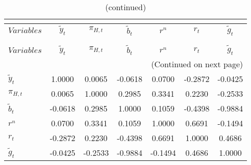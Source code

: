  
\begin{center}
\begin{longtable}{lcccccc} 
\caption{MATRIX OF CORRELATIONS}\\
 \label{Table:th_corr_matrix}\\
\toprule 
$Variables        $	 & 	 $   {\tilde{y}_{t}}$	 & 	 $       {\pi_{H,t}}$	 & 	 $     \tilde{b}_{t}$	 & 	 $            {r^{n}}$	 & 	 $            {r_{t}}$	 & 	 $     \tilde{g}_{t}$\\
\midrule \endfirsthead 
\caption{(continued)}\\
 \toprule \\ 
$Variables        $	 & 	 $   {\tilde{y}_{t}}$	 & 	 $       {\pi_{H,t}}$	 & 	 $     \tilde{b}_{t}$	 & 	 $            {r^{n}}$	 & 	 $            {r_{t}}$	 & 	 $     \tilde{g}_{t}$\\
\midrule \endhead 
\midrule \multicolumn{7}{r}{(Continued on next page)} \\ \bottomrule \endfoot 
\bottomrule \endlastfoot 
${\tilde{y}_{t}}  $	 & 	             1.0000	 & 	             0.0065	 & 	            -0.0618	 & 	             0.0700	 & 	            -0.2872	 & 	            -0.0425 \\ 
${\pi_{H,t}}      $	 & 	             0.0065	 & 	             1.0000	 & 	             0.2985	 & 	             0.3341	 & 	             0.2230	 & 	            -0.2533 \\ 
$\tilde{b}_{t}    $	 & 	            -0.0618	 & 	             0.2985	 & 	             1.0000	 & 	             0.1059	 & 	            -0.4398	 & 	            -0.9884 \\ 
${r^{n}}          $	 & 	             0.0700	 & 	             0.3341	 & 	             0.1059	 & 	             1.0000	 & 	             0.6691	 & 	            -0.1494 \\ 
${r_{t}}          $	 & 	            -0.2872	 & 	             0.2230	 & 	            -0.4398	 & 	             0.6691	 & 	             1.0000	 & 	             0.4686 \\ 
$\tilde{g}_{t}    $	 & 	            -0.0425	 & 	            -0.2533	 & 	            -0.9884	 & 	            -0.1494	 & 	             0.4686	 & 	             1.0000 \\ 
\end{longtable}
 \end{center}
